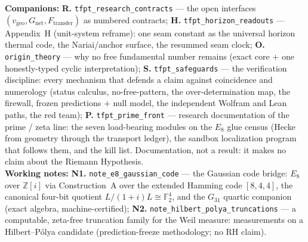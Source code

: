 \begin{navbox}
\noindent\textbf{Companions:} \textbf{R.} \texttt{tfpt\_research\_contracts} --- the open interfaces
$(v_{\mathrm{geo}}, G_{\mathrm{net}}, F_{\mathrm{transfer}})$ as numbered contracts;
\textbf{H.} \texttt{tfpt\_horizon\_readouts} --- Appendix~H (unit-system reframe): one seam constant as
the universal horizon thermal code, the Nariai/anchor surface, the resummed seam clock;
\textbf{O.} \texttt{origin\_theory} --- why no free fundamental number remains (exact core $+$ one
honestly-typed cyclic interpretation);
\textbf{S.} \texttt{tfpt\_safeguards} --- the verification discipline: every mechanism that defends a claim
against coincidence and numerology (status calculus, no-free-pattern, the over-determination map, the
firewall, frozen predictions $+$ null model, the independent Wolfram and Lean paths, the red team);
\textbf{P.} \texttt{tfpt\_prime\_front} --- research documentation of the prime / zeta line: the seven
load-bearing modules on the $E_8$ glue census (Hecke from geometry through the transport ledger), the
sandbox localization program that follows them, and the kill list. Documentation, not a result: it makes
no claim about the Riemann Hypothesis.\\[2pt]
\noindent\textbf{Working notes:} \textbf{N1.} \texttt{note\_e8\_gaussian\_code} --- the Gaussian code
bridge: $E_8$ over $\mathbb Z[i]$ via Construction~A over the extended Hamming code $[8,4,4]$, the
canonical four-bit quotient $L/(1{+}i)L\cong\mathbb F_2^4$, and the $G_{31}$ quartic companion (exact
algebra, machine-certified);
\textbf{N2.} \texttt{note\_hilbert\_polya\_truncations} --- a computable, zeta-free truncation family for
the Weil measure: measurements on a Hilbert--P\'olya candidate (prediction-freeze methodology; no RH
claim).
\end{navbox}
